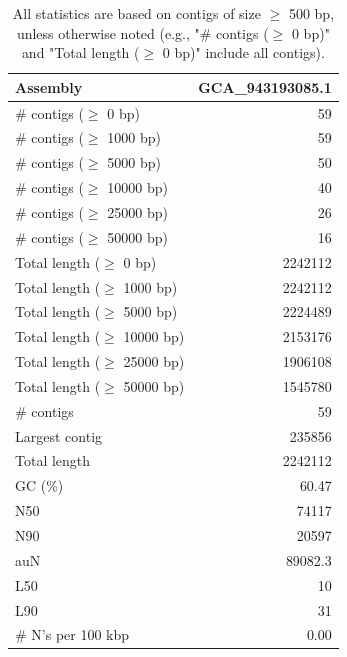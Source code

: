 \documentclass[12pt,a4paper]{article}
\begin{document}
\begin{table}[ht]
\begin{center}
\caption{All statistics are based on contigs of size $\geq$ 500 bp, unless otherwise noted (e.g., "\# contigs ($\geq$ 0 bp)" and "Total length ($\geq$ 0 bp)" include all contigs).}
\begin{tabular}{|l*{1}{|r}|}
\hline
Assembly & GCA\_943193085.1 \\ \hline
\# contigs ($\geq$ 0 bp) & 59 \\ \hline
\# contigs ($\geq$ 1000 bp) & 59 \\ \hline
\# contigs ($\geq$ 5000 bp) & 50 \\ \hline
\# contigs ($\geq$ 10000 bp) & 40 \\ \hline
\# contigs ($\geq$ 25000 bp) & 26 \\ \hline
\# contigs ($\geq$ 50000 bp) & 16 \\ \hline
Total length ($\geq$ 0 bp) & 2242112 \\ \hline
Total length ($\geq$ 1000 bp) & 2242112 \\ \hline
Total length ($\geq$ 5000 bp) & 2224489 \\ \hline
Total length ($\geq$ 10000 bp) & 2153176 \\ \hline
Total length ($\geq$ 25000 bp) & 1906108 \\ \hline
Total length ($\geq$ 50000 bp) & 1545780 \\ \hline
\# contigs & 59 \\ \hline
Largest contig & 235856 \\ \hline
Total length & 2242112 \\ \hline
GC (\%) & 60.47 \\ \hline
N50 & 74117 \\ \hline
N90 & 20597 \\ \hline
auN & 89082.3 \\ \hline
L50 & 10 \\ \hline
L90 & 31 \\ \hline
\# N's per 100 kbp & 0.00 \\ \hline
\end{tabular}
\end{center}
\end{table}
\end{document}
